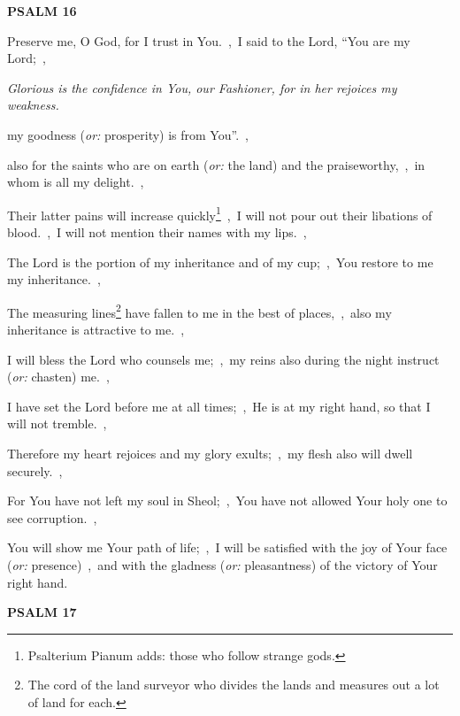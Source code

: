 \documentclass[12pt,twoside,a5paper]{article}
\newcommand{\psalm}[1]{\textbf{PSALM {#1}}\nopagebreak}
\newcommand{\qanona}[1]{{\liturgicalhint{Qanona.} \emph{#1}}}
\newcommand{\translationoption}[1]{\emph{or:} #1}
\begin{document}
\psalm{16}

\begin{normalparskip}
  Preserve me, O God, for I trust in You.~\sep\ I said to the Lord, ``You are my Lord;~\sep

  \qanona{Glorious is the confidence in You, our Fashioner, for in her rejoices my weakness.}

  my goodness (\translationoption{prosperity}) is from You''.~\sep

  also for the saints who are on earth (\translationoption{the land}) and the praiseworthy,~\sep\ in whom is all my delight.~\sep

  Their latter pains will increase quickly\footnote{Psalterium Pianum adds: those who follow strange gods.}~\sep\ I will not pour out their libations of blood.~\sep\ I will not mention their names with my lips.~\sep

  The Lord is the portion of my inheritance and of my cup;~\sep\ You restore to me my inheritance.~\sep

  The measuring lines\footnote{The cord of the land surveyor who divides the lands and measures out a lot of land for each.} have fallen to me in the best of places,~\sep\ also my inheritance is attractive to me.~\sep

  I will bless the Lord who counsels me;~\sep\ my reins also during the night instruct (\translationoption{chasten}) me.~\sep

  I have set the Lord before me at all times;~\sep\ He is at my right hand, so that I will not tremble.~\sep

  Therefore my heart rejoices and my glory exults;~\sep\ my flesh also will dwell securely.~\sep

  For You have not left my soul in Sheol;~\sep\ You have not allowed Your holy one to see corruption.~\sep

  You will show me Your path of life;~\sep\ I will be satisfied with the joy of Your face (\translationoption{presence})~\sep\ and with the gladness (\translationoption{pleasantness}) of the victory of Your right hand.
\end{normalparskip}

\psalm{17}
\end{document}
